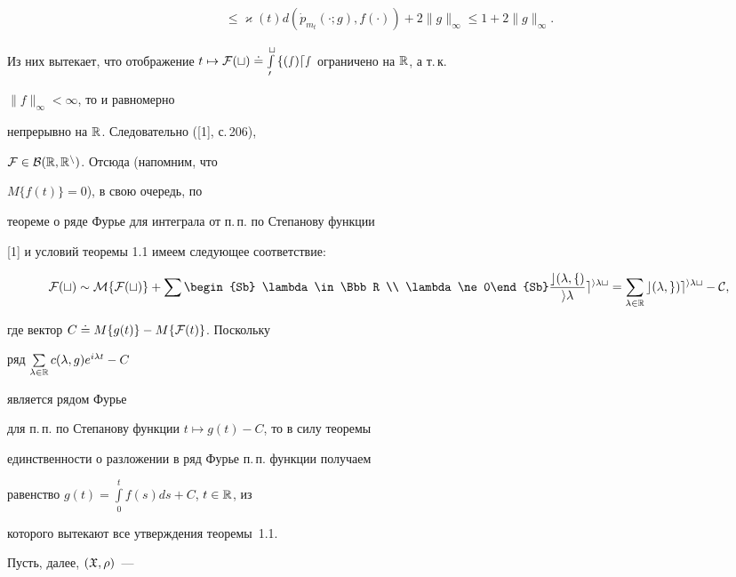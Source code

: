 \begin{pf}
\begin{multline*}
\leqslant \varkappa(t)


d(\Dot p_{m_{t}}(\cdot;g),f(\cdot))+2\|g\|_{\infty}\leqslant


1+2\|g\|_{\infty}.


\end{multline*} 


Из них вытекает, что отображение $t\mapsto\cal F(t)\doteq


\int\limits_0^t f(s)ds$ ограничено на $\Bbb R$, а т.\,к.


$\|f\|_{\infty}<\infty$, то и равномерно


непрерывно на $\Bbb R$. Следовательно ([1], с.\,206),


$\cal F\in B(\Bbb R,\Bbb R^n)$. Отсюда (напомним, что


$M\{f(t)\}=0$), в свою очередь, по


теореме о ряде Фурье для интеграла от п.\,п. по Степанову функции


[1] и условий теоремы 1.1 имеем следующее соответствие:


$$


\cal F(t)\sim M\{{\cal F}(t)\}


+\sum\begin{Sb} \lambda\in\Bbb R \\ \lambda\ne0\end{Sb}


\frac{c(\lambda,f)}{i\lambda}


e^{i\lambda t}=\sum\limits_{\lambda\in\Bbb R}


c(\lambda,g)e^{i\lambda t}-C,


$$


где вектор $C\doteq M\{g(t)\}-M\{{\cal F}(t)\}$. Поскольку


ряд $\sum\limits_{\lambda\in\Bbb R}c(\lambda,g)e^{i\lambda t}-C$


является рядом Фурье


для п.\,п. по Степанову функции $t\mapsto g(t)-C$, то в силу теоремы


единственности о разложении в ряд Фурье п.\,п. функции получаем


равенство $g(t)=\int\limits_0^t f(s)ds+C$, $t\in\Bbb R$, из


которого вытекают все утверждения теоремы~1.1.


\end{pf}





Пусть, далее, $(\frak X,\rho)$~---


